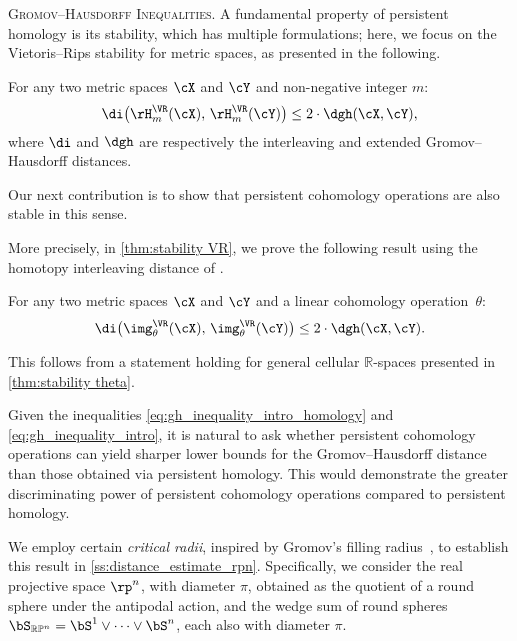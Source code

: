 \medskip\noindent\textsc{Gromov--Hausdorff Inequalities.}
A fundamental property of persistent homology is its stability, which has multiple formulations; here, we focus on the Vietoris--Rips stability for metric spaces, as presented in the following.
\begin{theorem*}
	For any two metric spaces $\cX$ and $\cY$ and non-negative integer $m$:
	\begin{equation}\label{eq:gh_inequality_intro_homology}
		\di\big(\rH_m^\VR(\cX),\, \rH_m^\VR(\cY)\big) \leq 2 \cdot \dgh(\cX,\cY),
	\end{equation}
	where \(\di\) and \(\dgh\) are respectively the interleaving and extended Gromov--Hausdorff distances.
\end{theorem*}

Our next contribution is to show that persistent cohomology operations are also stable in this sense.

More precisely, in \cref{thm:stability VR}, we prove the following result using the homotopy interleaving distance of \cite{blumberg2023interleaving}.

\begin{introtheorem}\label{thm:stability intro}
	For any two metric spaces $\cX$ and $\cY$ and a linear cohomology operation~$\theta$:
	\begin{equation}\label{eq:gh_inequality_intro}
		\di\big(\img_\theta^\VR(\cX),\, \img_\theta^\VR(\cY)\big) \leq 2 \cdot \dgh(\cX,\cY).
	\end{equation}
\end{introtheorem}

This follows from a statement holding for general cellular $\mathbb{R}$-spaces presented in \cref{thm:stability theta}.

\medskip Given the inequalities \eqref{eq:gh_inequality_intro_homology} and \eqref{eq:gh_inequality_intro},
it is natural to ask whether persistent cohomology operations can yield sharper lower bounds for the Gromov--Hausdorff distance than those obtained via persistent homology.
This would demonstrate the greater discriminating power of persistent cohomology operations compared to persistent homology.

We employ certain \textit{critical radii}, inspired by Gromov's filling radius~\cite{gromov1983filling}, to establish this result in \cref{ss:distance_estimate_rpn}.
Specifically, we consider the real projective space \(\rp^n\), with diameter \(\pi\), obtained as the quotient of a round sphere under the antipodal action, and the wedge sum of round spheres \(\bS_{\mathbb{RP}^n} = \bS^1 \vee \dots \vee \bS^n\), each also with diameter \(\pi\).

